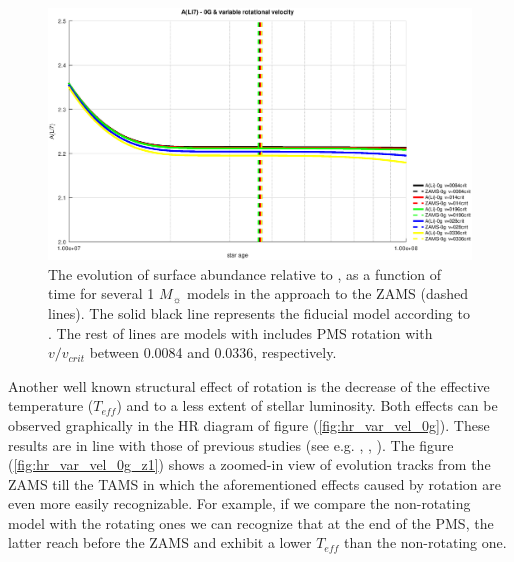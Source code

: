\documentclass[fleqn,usenatbib]{mnras}
\begin{document}
\begin{figure}
	\includegraphics[width=\columnwidth]{figures/li_var_vel_0_0g_z1.eps}
    \caption {The evolution of surface  abundance relative to , as a function of time for several 1 $M_{\sun}$ models in the approach to the ZAMS (dashed lines). The solid black line represents the fiducial model according to \citet{Choi2016}. The rest of lines are models with includes PMS rotation with $v/v_{crit}$ between 0.0084 and 0.0336, respectively.}
    \label{fig:li_var_vel_0g_z1}
\end{figure}

Another well known structural effect of rotation is the decrease of the effective temperature ($T_{eff}$) and to a less extent of stellar luminosity. Both effects can be observed graphically in the HR diagram of figure (\ref{fig:hr_var_vel_0g}). These results are in line with those of previous studies (see e.g. \citet{Eggenberger2012}, \citet{Piau2001}, \citet{Pinsonneault1989}). The figure (\ref{fig:hr_var_vel_0g_z1}) shows a zoomed-in view of evolution tracks from the ZAMS till the TAMS in which the aforementioned effects caused by rotation are even more easily recognizable. For example, if we compare the non-rotating model with the rotating ones we can recognize that at the end of the PMS, the latter reach before the ZAMS and exhibit a lower $T_{eff}$ than the non-rotating one.\par
\end{document}
